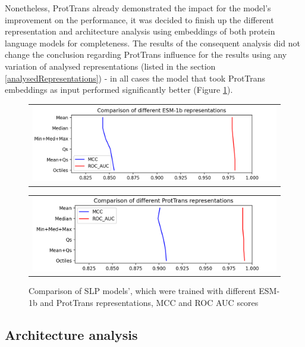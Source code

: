 \documentclass[12pt]{article}
\begin{document}
	Nonetheless, ProtTrans already demonstrated the impact for the 
	model's improvement on the performance, it was decided to finish up 
	the different representation and architecture analysis using embeddings
	of both protein language models for completeness. The results 
	of the consequent analysis 
	did not change the conclusion regarding ProtTrans influence for the 
	results using any variation of analysed representations (listed in the
	section \ref{analysedRepresentations}) - in all cases the model that took 
	ProtTrans embeddings as input performed significantly better (Figure 
	\ref{figure:scoresRepresentationsESMandPT}).

	\begin{figure}[h!]
		\centering
		\begin{tabular}{@{}c@{}}
			\includegraphics[scale=0.7]{SLP_ESM_003_diff_representations.png}
		\end{tabular}

		\begin{tabular}{@{}c@{}}
			\includegraphics[scale=0.7]{SLP_PT_003_diff_representations.png}
		\end{tabular}
		
		\caption{Comparison of SLP models', which were trained with different
		ESM-1b and ProtTrans representations, MCC and ROC AUC scores}
		\label{figure:scoresRepresentationsESMandPT}
	\end{figure}

	\newpage

	\subsection{Architecture analysis}
\end{document}
